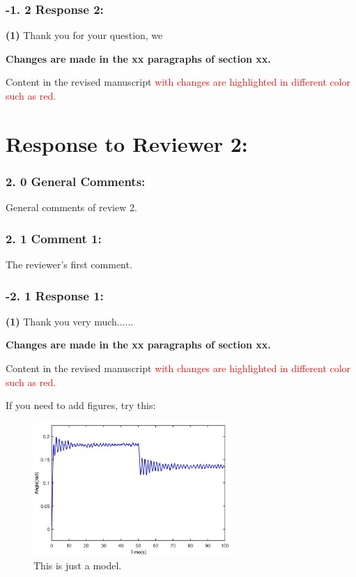 \documentclass{article}
\begin{document}
\subsubsection*{-1. 2   Response 2:}

\textbf{(1)} Thank you for your question, we


\textbf{Changes are made in the xx paragraphs of section xx.}

Content in the revised manuscript  \textcolor{red}{with changes are highlighted in different color such as red.}

\section*{Response to Reviewer 2:}
\subsubsection*{2. 0   General Comments:}
General comments of review 2.

\subsubsection*{2. 1   Comment 1:}

The reviewer's first comment.

\subsubsection*{-2. 1   Response 1:}
\textbf{(1)} Thank you very much......

\textbf{Changes are made in the xx paragraphs of section xx.}

Content in the revised manuscript  \textcolor{red}{with changes are highlighted in different color such as red.}

If you need to add figures, try this:
\begin{figure}[!htbp]
\centering
\includegraphics[width=7.5cm]{figure.jpg}
\caption{This is just a model.}
\label{fig1}
\notag %
\end{figure}
\end{document}
